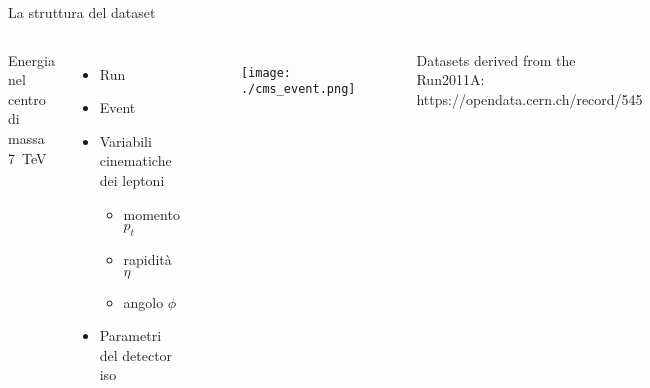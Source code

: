 \documentclass{beamer}
\begin{document}
\begin{frame}{La struttura del dataset}
  \begin{columns}
      \begin{block}{}
        \centering
        Energia nel centro di massa\linebreak
        \SI{7}{\tera\electronvolt}
        \vspace*{.3ex}
      \end{block}
      \begin{itemize}
        \item Run 
        \item Event
        \item Variabili cinematiche dei leptoni
        \begin{itemize}
          \item momento $p_t$
          \item rapidità $\eta$
          \item angolo $\phi$
        \end{itemize}
        \item Parametri del detector iso
      \end{itemize}

      \vspace*{6ex}
      \begin{figure}
        \centering
        \texttt{[image: ./cms\_event.png]}
      \end{figure}
%
  \begin{flushright}
    \scriptsize
    Datasets derived from the Run2011A:\\
    https://opendata.cern.ch/record/545
  \end{flushright}
  \vspace*{1ex}
  \end{columns}
\end{frame}
\end{document}

